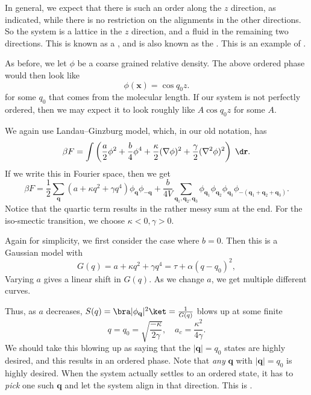 \documentclass[a4paper]{article}
\begin{document}
In general, we expect that there is such an order along the $z$ direction, as indicated, while there is no restriction on the alignments in the other directions. So the system is a lattice in the $z$ direction, and a fluid in the remaining two directions. This is known as a , and is also known as the . This is an example of .

As before, we let $\phi$ be a coarse grained relative density. The above ordered phase would then look like
\[
  \phi(\mathbf{x}) = \cos q_0 z.
\]
for some $q_0$ that comes from the molecular length. If our system is not perfectly ordered, then we may expect it to look roughly like $A \cos q_0 z$ for some $A$.

We again use Landau--Ginzburg model, which, in our old notation, has
\[
  \beta F = \int \left(\frac{a}{2} \phi^2 + \frac{b}{4} \phi^4 + \frac{\kappa}{2} (\nabla \phi)^2 + \frac{\gamma}{2} (\nabla^2 \phi)^2\right)\;\d \mathbf{r}.
\]
If we write this in Fourier space, then we get
\[
  \beta F = \frac{1}{2} \sum_{\mathbf{q}} (a + \kappa q^2 + \gamma q^4) \phi_{\mathbf{q}} \phi_{-\mathbf{q}} + \frac{b}{4V} \sum_{\mathbf{q}_1, \mathbf{q}_2, \mathbf{q}_3} \phi_{\mathbf{q}_1} \phi_{\mathbf{q}_2} \phi_{\mathbf{q}_3} \phi_{-(\mathbf{q}_1 + \mathbf{q}_2 + \mathbf{q}_3)}.
\]
Notice that the quartic term results in the rather messy sum at the end. For the iso-smectic transition, we choose $\kappa < 0, \gamma > 0$.

Again for simplicity, we first consider the case where $b = 0$. Then this is a Gaussian model with
\[
  G(q) = a + \kappa q^2 + \gamma q^4 = \tau + \alpha(q - q_0)^2,
\]
Varying $a$ gives a linear shift in $G(q)$. As we change $a$, we get multiple different curves.
\begin{center}
\end{center}
Thus, as $a$ decreases, $S(q) = \bra |\phi_\mathbf{q}|^2 \ket = \frac{1}{G(q)}$ blows up at some finite
\[
  q = q_0 = \sqrt{\frac{-\kappa}{2\gamma}},\quad a_c = \frac{\kappa^2}{4 \gamma}.
\]
We should take this blowing up as saying that the $|\mathbf{q}| = q_0$ states are highly desired, and this results in an ordered phase. Note that \emph{any} $\mathbf{q}$ with $|\mathbf{q}| = q_0$ is highly desired. When the system actually settles to an ordered state, it has to \emph{pick} one such $\mathbf{q}$ and let the system align in that direction. This is .
\end{document}
